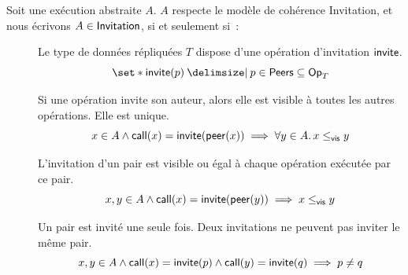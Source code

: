 \begin{definition}[Invitation]\label{def:invitation-consistency}
Soit une exécution abstraite $A$. $A$ respecte le modèle de cohérence Invitation, et nous écrivons $A \in \operatorname{\mathsf{Invitation}}$, si et seulement si~:
\begin{description}
  \item[]
  Le type de données répliquées $T$ dispose d'une opération d'invitation $\operatorname{\mathsf{invite}}$.
  \begin{equation*}
  \set*{\trm{invite}(p) \given p \in \trm{Peers}} \subseteq \trm{Op}_T
  \end{equation*}

  \item[]
  Si une opération invite son auteur, alors elle est visible à toutes les autres opérations.
  Elle est unique.
  \begin{equation*}
      x \in A \land \operatorname{\mathsf{call}}(x) = \operatorname{\mathsf{invite}}(\operatorname{\mathsf{peer}}(x)) \implies \forall y \in A \ldotp x \leq_{\operatorname{\mathsf{vis}}} y 
  \end{equation*}

  \item[]
  L'invitation d'un pair est visible ou égal à chaque opération exécutée par ce pair.
  \begin{equation*}
      x, y \in A \land \operatorname{\mathsf{call}}(x) = \operatorname{\mathsf{invite}}(\operatorname{\mathsf{peer}}(y)) \implies x \leq_{\operatorname{\mathsf{vis}}} y
  \end{equation*}

  \item[]
  Un pair est invité une seule fois.
  Deux invitations ne peuvent pas inviter le même pair.
  \begin{equation*}
      x, y \in A \land \operatorname{\mathsf{call}}(x) = \operatorname{\mathsf{invite}}(p) \land \operatorname{\mathsf{call}}(y) = \operatorname{\mathsf{invite}}(q) \implies p \neq q
  \end{equation*}
  \end{description}
\end{definition}


